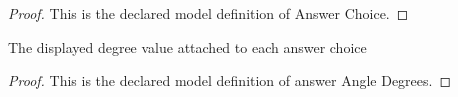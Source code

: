 \begin{proof}
  This is the declared model definition of Answer Choice.
\end{proof}
\begin{definition}
  \label{def:physics:phyx-mini-0008:phyxminiproblems-problem0008-answerangledegrees}
  The displayed degree value attached to each answer choice
\end{definition}
\begin{proof}
  This is the declared model definition of answer Angle Degrees.
\end{proof}
